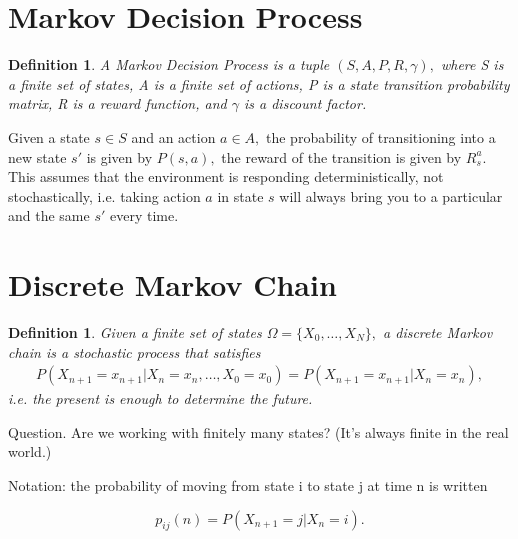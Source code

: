 \documentclass[10pt]{article}
\theoremstyle{plain}
\newtheorem{definition}[theorem]{Definition}
\theoremstyle{definition}
\theoremstyle{remark}
\newcommand{\0}{\varnothing}
\newcommand{\<}{\langle}
\renewcommand{\>}{\rangle}
\begin{document}
\section{Markov Decision Process}

\begin{definition}
  A Markov Decision Process is a tuple \( (S, A, P, R, \gamma), \) where S is a finite set of states, A is a finite set of actions, P is a state transition probability matrix, R is a reward function, and \( \gamma \) is a discount factor.
\end{definition}

Given a state \( s \in S \) and an action \( a \in A, \) the probability of
transitioning into a new state \( s' \) is given by \( P(s, a), \) the reward of
the transition is given by \( R_s^a. \) This assumes that the environment is
responding deterministically, not stochastically, i.e. taking action \( a \) in
state \( s \) will always bring you to a particular and the same \( s' \) every
time.

\section{Discrete Markov Chain}

\begin{definition}
  Given a finite set of states \( \Omega = \{ X_0, \ldots, X_N \}, \) a discrete Markov chain is a stochastic process that satisfies
\small
\begin{align*}
  P \left( X _ { n + 1 } = x _ { n + 1 } | X _ { n } = x _ { n } , \ldots , X _ { 0 } = x _ { 0 } \right) = P \left( X _ { n + 1 } = x _ { n + 1 } | X _ { n } = x _ { n } \right),
\end{align*}
\normalsize
  i.e. the present is enough to determine the future.
\end{definition}

Question. Are we working with finitely many states? (It's always finite in the real world.)

Notation: the probability of moving from state i to state j at time n is written

\[
p _ { i j } ( n ) = P \left( X _ { n + 1 } = j | X _ { n } = i \right).
\]
\end{document}

